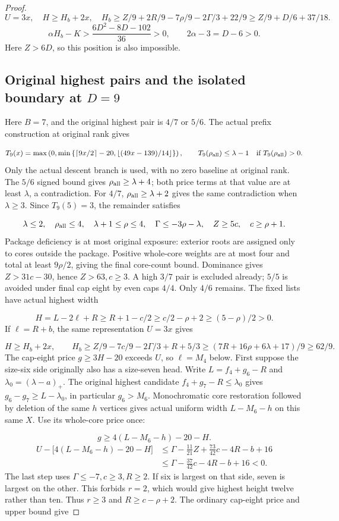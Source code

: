 \documentclass[11pt,a4paper]{article}
\newcommand{\floor}[1]{\left\lfloor#1\right\rfloor}
\newcommand{\ceil}[1]{\left\lceil#1\right\rceil}
\theoremstyle{definition}
\begin{document}
\begin{proof}
\[
U=3x,\quad H\ge H_b+2x,\quad
H_b\ge Z/9+2R/9-7\rho/9-2\Gamma/3+22/9
\ge Z/9+D/6+37/18.
\]
\[
\alpha H_b-K>\frac{6D^2-8D-102}{36}>0,\qquad
2\alpha-3=D-6>0.
\]
Here $Z>6D$, so this position is also impossible.

\subsection*{Original highest pairs and the isolated boundary at $D=9$}
Here $B=7$, and the original highest pair is $4/7$ or $5/6$.
The actual prefix construction at original rank gives

\[
T_9(x)=\max\left(0,\min\left\{\ceil{9x/2}-20,
\floor{(49x-139)/14}\right\}\right),\qquad
T_9(\rho_{\rm all})\le\lambda-1
\quad\text{if }T_9(\rho_{\rm all})>0.
\]
Only the actual descent branch is used, with no zero baseline at original rank.
The $5/6$ signed bound gives $\rho_{\rm all}\ge\lambda+4$;
both price terms at that value are at least $\lambda$, a contradiction.
For $4/7$, $\rho_{\rm all}\ge\lambda+2$ gives the same contradiction when
$\lambda\ge3$. Since $T_9(5)=3$, the remainder satisfies

\[
\lambda\le2,\quad \rho_{\rm all}\le4,\quad
\lambda+1\le\rho\le4,\quad
\Gamma\le-3\rho-\lambda,\quad Z\ge5c,\quad c\ge\rho+1.
\]
Package deficiency is at most original exposure: exterior roots are
assigned only to cores outside the package.
Positive whole-core weights are at most four and total at least $9\rho/2$,
giving the final core-count bound.
Dominance gives $Z>31c-30$, hence $Z>63,c\ge3$.
A high $3/7$ pair is excluded already; $5/5$ is avoided under final cap eight
by even caps $4/4$. Only $4/6$ remains.
The fixed lists have actual highest width

\[
H=L-2\ell+R\ge R+1-c/2
\ge c/2-\rho+2\ge(5-\rho)/2>0.
\]
If $\ell=R+b$, the same representation $U=3x$ gives

\[
H\ge H_b+2x,\qquad
H_b\ge Z/9-7c/9-2\Gamma/3+R+5/3
\ge(7R+16\rho+6\lambda+17)/9\ge62/9.
\]
The cap-eight price $g\ge3H-20$ exceeds $U$, so $\ell=M_4$ below.
First suppose the size-six side originally also has a size-seven head.
Write $L=f_4+g_6-R$ and $\lambda_0=(\lambda-a)_+$.
The original highest candidate $f_4+g_7-R\le\lambda_0$ gives
$g_6-g_7\ge L-\lambda_0$, in particular $g_6>M_6$.
Monochromatic core restoration followed by deletion of the same $h$ vertices
gives actual uniform width $L-M_6-h$ on this same $X$.
Use its whole-core price once:

\[
g\ge4(L-M_6-h)-20-H.
\]
\[
\begin{split}
U-\bigl[4(L-M_6-h)-20-H\bigr]
&\le\Gamma-\frac{11}{21}Z+\frac{73}{42}c-4R-b+16\\
&\le\Gamma-\frac{37}{42}c-4R-b+16<0.
\end{split}
\]
The last step uses $\Gamma\le-7,c\ge3,R\ge2$.
If six is largest on that side, seven is largest on the other.
This forbids $r=2$, which would give highest height twelve rather than ten.
Thus $r\ge3$ and $R\ge c-\rho+2$.
The ordinary cap-eight price and upper bound give


\end{proof}
\end{document}
